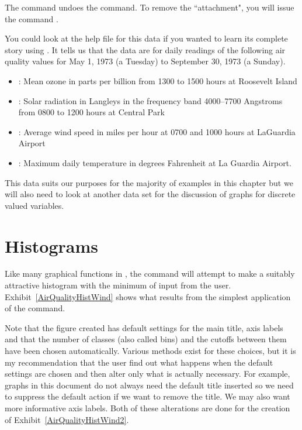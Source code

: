 The  command undoes the  command. To remove the ``attachment", you will issue the command . 
 
You could look at the help file for this data if you wanted to learn its complete story using . It tells us that the data are for daily readings of the following air quality values for May 1, 1973 (a 
Tuesday) to September 30, 1973 (a Sunday). 
\begin{itemize} 
\item {}: Mean ozone in parts per 
billion from 1300 to 1500 hours at Roosevelt Island 
\item {}: Solar radiation 
in Langleys in the frequency band 4000--7700 Angstroms from 
0800 to 1200 hours at Central Park 
\item {}: Average wind speed in miles 
per hour at 0700 and 1000 hours at LaGuardia Airport 
\item {}: Maximum daily 
temperature in degrees Fahrenheit at La Guardia Airport. 
\end{itemize} 
 
This data suits our purposes for the majority of examples in this chapter but we will also need to look at another data set for the discussion of graphs for discrete valued variables. 
 
\section{Histograms} 
 
Like many graphical functions in \R{}, the  command will attempt to make a suitably attractive histogram with the minimum of input from the user. Exhibit~\ref{AirQualityHistWind} shows what results from the simplest application of the  command. 
 
Note that the figure created has default settings for the main title, axis labels and that the number of classes (also called bins) and the cutoffs between them have been chosen automatically. Various methods exist for these choices, but it is my recommendation that the user find out what happens when the default settings are chosen and then alter only what is actually necessary. For example, graphs in this document do not always need the default title inserted so we need to suppress the default action if we want to remove the title. We may also want more informative axis labels. Both of these alterations are done for the creation of Exhibit~\ref{AirQualityHistWind2}.  
 
